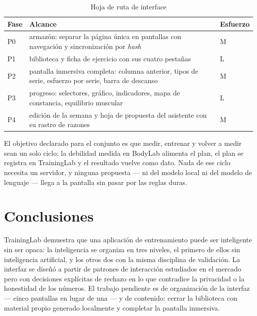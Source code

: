 \documentclass[conference]{IEEEtran}
\begin{document}
\begin{table}[t]
\caption{Hoja de ruta de interface}
\label{tab:roadmap}
\centering
\footnotesize
\begin{tabular}{@{}p{8mm}p{48mm}p{14mm}@{}}
\toprule
Fase & Alcance & Esfuerzo \\
\midrule
P0 & armaz\'on: separar la p\'agina \'unica en pantallas con navegaci\'on y sincronizaci\'on por \emph{hash} & M \\
P1 & biblioteca y ficha de ejercicio con sus cuatro pesta\~nas & L \\
P2 & pantalla inmersiva completa: columna anterior, tipos de serie, esfuerzo por serie, barra de descanso & M \\
P3 & progreso: selectores, gr\'afico, indicadores, mapa de constancia, equilibrio muscular & L \\
P4 & edici\'on de la semana y hoja de propuesta del asistente con su rastro de razones & M \\
\bottomrule
\end{tabular}
\end{table}

El objetivo declarado para el conjunto es que medir, entrenar y volver a medir
sean un solo ciclo: la debilidad medida en BodyLab alimenta el plan, el plan se
registra en TrainingLab y el resultado vuelve como dato. Nada de ese ciclo
necesita un servidor, y ninguna propuesta --- ni del modelo local ni del modelo
de lenguaje --- llega a la pantalla sin pasar por las reglas duras.

\section{Conclusiones}
TrainingLab demuestra que una aplicaci\'on de entrenamiento puede ser
inteligente sin ser opaca: la inteligencia se organiza en tres niveles, el
primero de ellos sin inteligencia artificial, y los otros dos con la misma
disciplina de validaci\'on. La interfaz se dise\~n\'o a partir de patrones de
interacci\'on estudiados en el mercado pero con decisiones expl\'icitas de
rechazo en lo que contradice la privacidad o la honestidad de los n\'umeros. El
trabajo pendiente es de organizaci\'on de la interfaz --- cinco pantallas en
lugar de una --- y de contenido: cerrar la biblioteca con material propio
generado localmente y completar la pantalla inmersiva.
\end{document}
